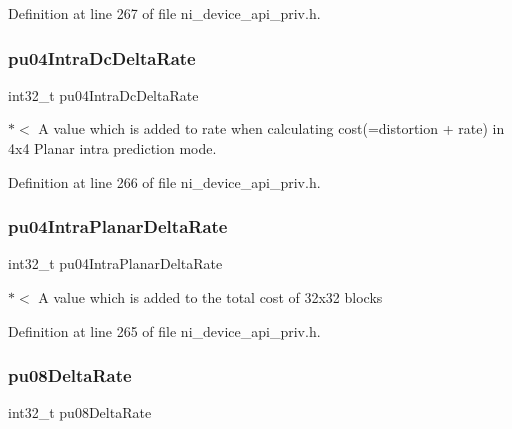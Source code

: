 Definition at line 267 of file ni\+\_\+device\+\_\+api\+\_\+priv.\+h.

\mbox{\label{struct__ni__t408__config__t_a6e4b90cba815c84204a7a72391c79b15}} 
\subsubsection{\texorpdfstring{pu04IntraDcDeltaRate}{pu04IntraDcDeltaRate}}
{\footnotesize\ttfamily int32\+\_\+t pu04\+Intra\+Dc\+Delta\+Rate}

$\ast$$<$ A value which is added to rate when calculating cost(=distortion + rate) in 4x4 Planar intra prediction mode. 

Definition at line 266 of file ni\+\_\+device\+\_\+api\+\_\+priv.\+h.

\mbox{\label{struct__ni__t408__config__t_a93475bd4b52bcead6869bf5379a46e83}} 
\subsubsection{\texorpdfstring{pu04IntraPlanarDeltaRate}{pu04IntraPlanarDeltaRate}}
{\footnotesize\ttfamily int32\+\_\+t pu04\+Intra\+Planar\+Delta\+Rate}

$\ast$$<$ A value which is added to the total cost of 32x32 blocks 

Definition at line 265 of file ni\+\_\+device\+\_\+api\+\_\+priv.\+h.

\mbox{\label{struct__ni__t408__config__t_abdf9fae442651dc7bbad1c64e3c4a8e8}} 
\subsubsection{\texorpdfstring{pu08DeltaRate}{pu08DeltaRate}}
{\footnotesize\ttfamily int32\+\_\+t pu08\+Delta\+Rate}

